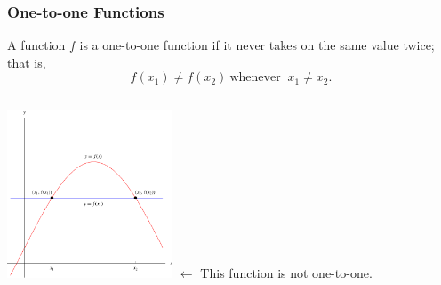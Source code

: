 \begin{frame}
\frametitle{One-to-one Functions}
\begin{definition}
A function $f$ is a one-to-one function if it never takes on the same value twice; that is,
\[
f(x_1) \neq f(x_2) \ \text{whenever }  \ x_1 \neq x_2 .
\]
\end{definition}
\begin{columns}[c]
\includegraphics[height=5cm]{inverse-functions/pictures/07-01-1-1def.pdf}%
$\leftarrow$ This function is not one-to-one.
\end{columns}
\end{frame}
